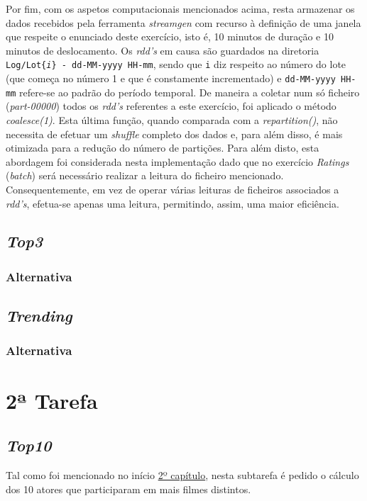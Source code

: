 \documentclass[a4paper]{report}
\begin{document}
        Por fim, com os aspetos computacionais mencionados acima, resta armazenar os dados recebidos pela ferramenta \textit{streamgen} com recurso à definição de uma janela que respeite o enunciado deste exercício, isto é, 10 minutos de duração e 10 minutos de deslocamento.
        Os \textit{rdd's} em causa são guardados na diretoria \texttt{Log/Lot\{\textit{i}\} - dd-MM-yyyy HH-mm}, sendo que \texttt{i} diz respeito ao número do lote (que começa no número 1 e que é constamente incrementado) e \texttt{dd-MM-yyyy HH-mm} refere-se ao padrão do período temporal.
        De maneira a coletar num só ficheiro (\textit{part-00000}) todos os \textit{rdd's} referentes a este exercício, foi aplicado o método \textit{coalesce(1)}.
        Esta última função, quando comparada com a \textit{repartition()}, não necessita de efetuar um \textit{shuffle} completo dos dados e, para além disso, é mais otimizada para a redução do número de partições.
        Para além disto, esta abordagem foi considerada nesta implementação dado que no exercício \textit{Ratings} (\textit{batch}) será necessário realizar a leitura do ficheiro mencionado. Consequentemente, em vez de operar várias leituras de ficheiros associados a \textit{rdd's}, efetua-se apenas uma leitura, permitindo, assim, uma maior eficiência.

        \subsection{\textit{Top3}} \label{subsec:Task1-Top3}
            \subsubsection{Alternativa} \label{sssec:Task1-Top3-Alternativa} 

        \subsection{\textit{Trending}} \label{subsec:Task1-Trending}
            \subsubsection{Alternativa} \label{sssec:Task1-Trending-Alternativa}

    \section{2ª Tarefa} \label{sec:Task2}

        \subsection{\textit{Top10}} \label{subsec:Task2-Top10}
            Tal como foi mencionado no início \hyperref[ch:Implementation]{2º capítulo}, nesta subtarefa é pedido o cálculo dos 10 atores que participaram em mais filmes distintos.
\end{document}
